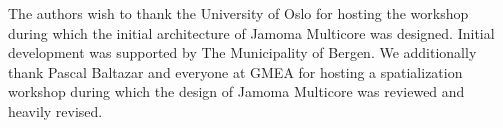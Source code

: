 \documentclass[twoside,a4paper]{article}
\begin{document}
The authors wish to thank the University of Oslo for hosting the workshop during which the initial architecture of Jamoma Multicore was designed. Initial development was supported by The Municipality of Bergen.  We additionally thank Pascal Baltazar and everyone at GMEA for hosting a spatialization workshop during which the design of Jamoma Multicore was reviewed and heavily revised.





\end{document}
